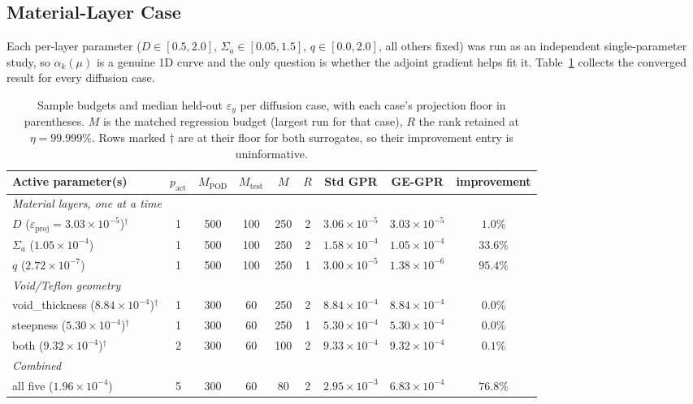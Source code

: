 \documentclass[]{ANStopical}
\begin{document}
\subsection{Material-Layer Case}\label{sec:results-material}

Each per-layer parameter ($D\in[0.5,2.0]$, $\Sigma_a\in[0.05,1.5]$, $q\in[0.0,2.0]$, all others fixed) was run as an independent single-parameter study, so $\alpha_k(\mu)$ is a genuine 1D curve and the only question is whether the adjoint gradient helps fit it. Table~\ref{tab:allcases} collects the converged result for every diffusion case.

\begin{table}[!ht]
\caption{Sample budgets and median held-out $\varepsilon_y$ per diffusion case, with each case's projection floor in parentheses. $M$ is the matched regression budget (largest run for that case), $R$ the rank retained at $\eta=99.999\%$. Rows marked $\dagger$ are at their floor for both surrogates, so their improvement entry is uninformative.}
\label{tab:allcases}
\begin{center}
\footnotesize
\begin{tabular}{lcccccccc}
\hline
Active parameter(s) & $p_{\mathrm{act}}$ & $M_{\mathrm{POD}}$ & $M_{\mathrm{test}}$ & $M$ & $R$ & Std GPR & GE-GPR & improvement \\
\hline
\multicolumn{9}{l}{\emph{Material layers, one at a time}} \\
$D$ \hfill ($\varepsilon_{\mathrm{proj}}=3.03\times10^{-5}$)$^\dagger$        & 1 & 500 & 100 & 250 & 2 & $3.06\times10^{-5}$ & $3.03\times10^{-5}$ & $1.0\%$ \\
$\Sigma_a$ \hfill ($1.05\times10^{-4}$)                                        & 1 & 500 & 100 & 250 & 2 & $1.58\times10^{-4}$ & $1.05\times10^{-4}$ & $33.6\%$ \\
$q$ \hfill ($2.72\times10^{-7}$)                                               & 1 & 500 & 100 & 250 & 1 & $3.00\times10^{-5}$ & $1.38\times10^{-6}$ & $95.4\%$ \\
\multicolumn{9}{l}{\emph{Void/Teflon geometry}} \\
void\_thickness \hfill ($8.84\times10^{-4}$)$^\dagger$                         & 1 & 300 & 60  & 250 & 2 & $8.84\times10^{-4}$ & $8.84\times10^{-4}$ & $0.0\%$ \\
steepness \hfill ($5.30\times10^{-4}$)$^\dagger$                               & 1 & 300 & 60  & 250 & 1 & $5.30\times10^{-4}$ & $5.30\times10^{-4}$ & $0.0\%$ \\
both \hfill ($9.32\times10^{-4}$)$^\dagger$                                    & 2 & 300 & 60  & 100 & 2 & $9.33\times10^{-4}$ & $9.32\times10^{-4}$ & $0.1\%$ \\
\multicolumn{9}{l}{\emph{Combined}} \\
all five \hfill ($1.96\times10^{-4}$)                                          & 5 & 300 & 60  & 80  & 2 & $2.95\times10^{-3}$ & $6.83\times10^{-4}$ & $76.8\%$ \\
\hline
\end{tabular}
\end{center}
\end{table}
\end{document}
